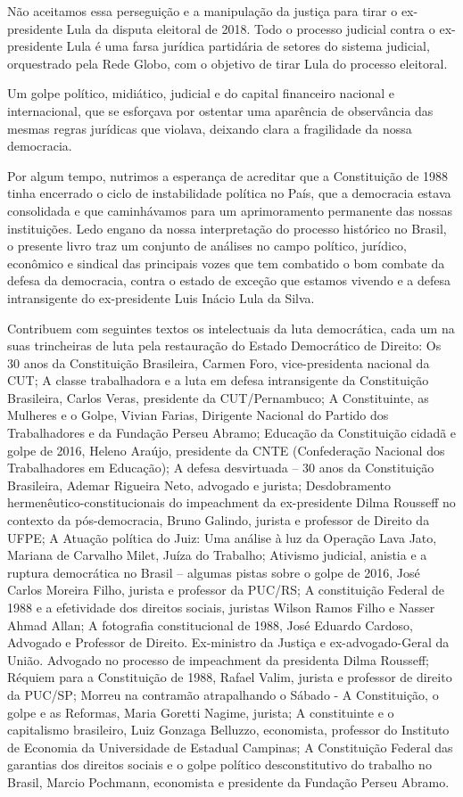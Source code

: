 Não aceitamos essa perseguição e a manipulação da justiça para tirar o ex-presidente Lula da disputa eleitoral de 2018. Todo o processo judicial contra o ex-presidente Lula é uma farsa jurídica partidária de setores do sistema judicial, orquestrado pela Rede Globo, com o objetivo de tirar Lula do processo eleitoral.

Um golpe político, midiático, judicial e do capital financeiro nacional e internacional, que se esforçava por ostentar uma aparência de observância das mesmas regras jurídicas que violava, deixando clara a fragilidade da nossa democracia.

Por algum tempo, nutrimos a esperança de acreditar que a Constituição de 1988 tinha encerrado o ciclo de instabilidade política no País, que a democracia estava consolidada e que caminhávamos para um aprimoramento permanente das nossas instituições. Ledo engano da nossa interpretação do processo histórico no Brasil, o presente livro traz um conjunto de análises no campo político, jurídico, econômico e sindical das principais vozes que tem combatido o bom combate da defesa da democracia, contra o estado de exceção que estamos vivendo e a defesa intransigente do ex-presidente Luis Inácio Lula da Silva.

Contribuem com seguintes textos os intelectuais da luta democrática, cada um na suas trincheiras de luta pela restauração do Estado Democrático de Direito: Os 30 anos da Constituição Brasileira, Carmen Foro, vice-presidenta nacional da CUT; A classe trabalhadora e a luta em defesa intransigente da Constituição Brasileira, Carlos Veras, presidente da CUT/Pernambuco; A Constituinte, as Mulheres e o Golpe, Vivian Farias, Dirigente Nacional do Partido dos Trabalhadores e da Fundação Perseu Abramo; Educação da Constituição cidadã e golpe de 2016, Heleno Araújo, presidente da CNTE (Confederação Nacional dos Trabalhadores em Educação); A defesa desvirtuada – 30 anos da Constituição Brasileira, Ademar Rigueira Neto, advogado e jurista; Desdobramento hermenêutico-constitucionais do impeachment da ex-presidente Dilma Rousseff no contexto da pós-democracia, Bruno Galindo, jurista e professor de Direito da UFPE; A Atuação política do Juiz: Uma análise à luz da Operação Lava Jato, Mariana de Carvalho Milet, Juíza do Trabalho; Ativismo judicial, anistia e a ruptura democrática no Brasil – algumas pistas sobre o golpe de 2016, José Carlos Moreira Filho, jurista e professor da PUC/RS;  A constituição  Federal de 1988 e a efetividade dos direitos sociais,  juristas Wilson Ramos Filho e Nasser Ahmad Allan;  A fotografia constitucional de 1988, José Eduardo Cardoso, Advogado e Professor de Direito. Ex-ministro da Justiça e ex-advogado-Geral da União. Advogado no processo de impeachment da presidenta Dilma Rousseff; Réquiem para a Constituição de 1988, Rafael Valim, jurista e professor de direito da PUC/SP; Morreu na contramão atrapalhando o Sábado - A Constituição, o golpe e as Reformas, Maria Goretti Nagime, jurista; A constituinte e o capitalismo brasileiro, Luiz Gonzaga Belluzzo, economista, professor do Instituto de Economia da Universidade de Estadual Campinas; A Constituição Federal das garantias dos direitos sociais e o golpe político desconstitutivo do trabalho no Brasil, Marcio Pochmann, economista e presidente da Fundação Perseu Abramo.

